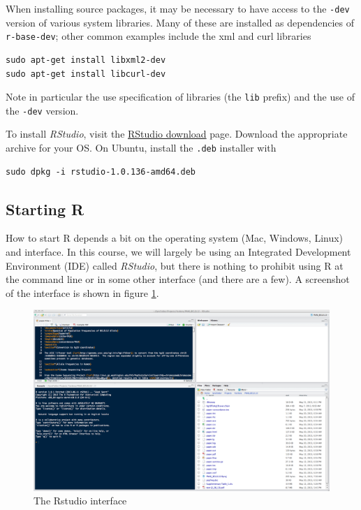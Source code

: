 \documentclass[]{article}
\theoremstyle{definition}
\theoremstyle{definition}
\theoremstyle{remark}
\begin{document}
When installing source packages, it may be necessary to have access to
the \texttt{-dev} version of various system libraries. Many of these are
installed as dependencies of \texttt{r-base-dev}; other common examples
include the xml and curl libraries

\begin{verbatim}
sudo apt-get install libxml2-dev
sudo apt-get install libcurl-dev
\end{verbatim}

Note in particular the use specification of libraries (the \texttt{lib}
prefix) and the use of the \texttt{-dev} version.

To install \emph{RStudio}, visit the
\href{https://www.rstudio.com/products/rstudio/download/}{RStudio
download} page. Download the appropriate archive for your OS. On Ubuntu,
install the \texttt{.deb} installer with

\begin{verbatim}
sudo dpkg -i rstudio-1.0.136-amd64.deb
\end{verbatim}

\subsection{Starting R}\label{starting-r}

How to start R depends a bit on the operating system (Mac, Windows,
Linux) and interface. In this course, we will largely be using an
Integrated Development Environment (IDE) called \emph{RStudio}, but
there is nothing to prohibit using R at the command line or in some
other interface (and there are a few). A screenshot of the interface is
shown in figure \ref{fig:rstudiointerface}.

\begin{figure}
\includegraphics[width=26.67in]{images/RStudio} \caption{The Rstudio interface}\label{fig:rstudiointerface}
\end{figure}
\end{document}
